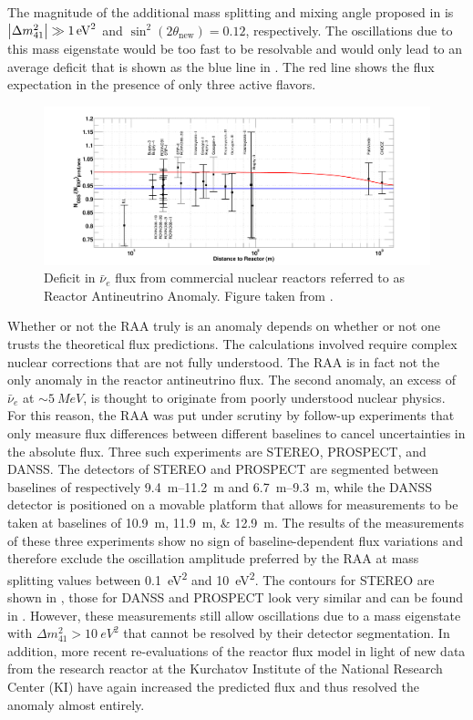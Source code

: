 The magnitude of the additional mass splitting and mixing angle proposed in \cite{Mention:2011rk} is $\abs{\Delta m^2_{41}} \gg \SI{1}{eV^2}$ and $\sin^2(2\theta_\mathrm{new})=0.12$, respectively.
The oscillations due to this mass eigenstate would be too fast to be resolvable and would only lead to an average deficit that is shown as the blue line in .
The red line shows the flux expectation in the presence of only three active flavors.
\begin{figure}
    \centering
    \includegraphics{figures/theory/raa.pdf}
    \caption{Deficit in $\bar{\nu}_e$ flux from commercial nuclear reactors referred to as Reactor Antineutrino Anomaly. Figure taken from \cite{Mention:2011rk}.\label{fig:raa}}
\end{figure}

Whether or not the RAA truly is an anomaly depends on whether or not one trusts the theoretical flux predictions.
The calculations involved require complex nuclear corrections that are not fully understood.
The RAA is in fact not the only anomaly in the reactor antineutrino flux.
The second anomaly, an excess of $\bar{\nu}_e$ at $\sim \SI{5}{MeV}$, is thought to originate from poorly understood nuclear physics\cite{HUBER2016268}.
For this reason, the RAA was put under scrutiny by follow-up experiments that only measure flux differences between different baselines to cancel uncertainties in the absolute flux.
Three such experiments are STEREO, PROSPECT, and DANSS.
The detectors of STEREO and PROSPECT are segmented between baselines of respectively \SIrange{9.4}{11.2}{m} and \SIrange{6.7}{9.3}{m}, while the DANSS detector is positioned on a movable platform that allows for measurements to be taken at baselines of \SIlist{10.9;11.9;12.9}{m}.
The results of the measurements of these three experiments show no sign of baseline-dependent flux variations and therefore exclude the oscillation amplitude preferred by the RAA at mass splitting values between \SI{0.1}{eV^2} and \SI{10}{eV^2}.
The contours for \textsc{STEREO} are shown in , those for \textsc{DANSS} and \textsc{PROSPECT} look very similar and can be found in \cite{Licciardi:2021hyi}.
However, these measurements still allow oscillations due to a mass eigenstate with $\Delta m^2_{41}> \SI{10}{eV^2}$ that cannot be resolved by their detector segmentation.
In addition, more recent re-evaluations of the reactor flux model in light of new data from the research reactor at the Kurchatov Institute of the National Research Center (KI) have again increased the predicted flux and thus resolved the anomaly almost entirely.

